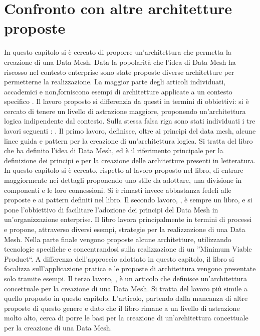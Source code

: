 \documentclass[12pt]{report}
\begin{document}
\section{Confronto con altre architetture proposte}
In questo capitolo si è cercato di proporre un'architettura che permetta la creazione di una Data Mesh. 
Data la popolarità che l'idea di Data Mesh ha riscosso nel contesto enterprise sono state proposte diverse architetture per permetterne la realizzazione.
La maggior parte degli articoli individuati, accademici e non,forniscono esempi di architetture applicate a un contesto specifico \cite{falconi2023adopting,pakrashi2023cowmesh,joshi_data_2021,blog_data_2022}.
Il lavoro proposto si differenzia da questi in termini di obbiettivi: si è cercato di tenere un livello di astrazione maggiore, proponendo un'architettura logica indipendente dal contesto. 
Sulla stessa falsa riga sono stati individuati i tre lavori seguenti : \cite{dehghani_data_2022, majchrzak2023data,machado2021data}.
Il primo lavoro, \cite{dehghani_data_2022} definisce, oltre ai principi del data mesh, alcune linee guida e pattern per la creazione di un'architettura logica.
Si tratta del libro che ha definito l'idea di Data Mesh, ed è il riferimento principale per la definizione dei principi e per la creazione delle architetture presenti in letteratura.
In questo capitolo si è cercato, rispetto al lavoro proposto nel libro, di entrare maggiormente nei dettagli proponendo uno stile da adottare, una divisione in componenti e le loro connessioni.
Si è rimasti invece abbastanza fedeli alle proposte e ai pattern definiti nel libro.
Il secondo lavoro, \cite{majchrzak2023data}, è sempre un libro, e si pone l'obbiettivo di facilitare l'adozione dei principi del Data Mesh in un'organizzazione enterprise.
Il libro lavora principalmente in termini di processi e propone, attraverso diversi esempi, strategie per la realizzazione di una Data Mesh.
Nella parte finale vengono proposte alcune architetture, utilizzando tecnologie specifiche e concentrandosi sulla realizzazione di un ''Minimum Viable Product``.
A differenza dell'approccio adottato in questo capitolo, il libro si focalizza sull'applicazione pratica e le proposte di architettura vengono presentate solo tramite esempi.
Il terzo lavoro, \cite{machado2021data}, è un articolo che definisce un'architettura concettuale per la creazione di una Data Mesh.
Si tratta del lavoro più simile a quello proposto in questo capitolo.
L'articolo, partendo dalla mancanza di altre proposte di questo genere e dato che il libro \cite{dehghani_data_2022} rimane a un livello di astrazione molto alto, cerca di porre le basi per la creazione di un'architettura concettuale per la creazione di una Data Mesh.
\end{document}
